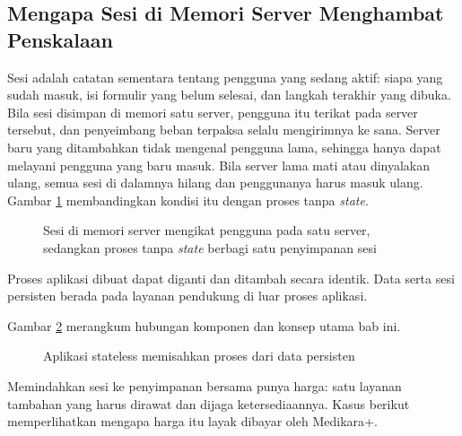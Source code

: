 \subsection{Mengapa Sesi di Memori Server Menghambat Penskalaan}

Sesi adalah catatan sementara tentang pengguna yang sedang aktif: siapa yang sudah masuk,
isi formulir yang belum selesai, dan langkah terakhir yang dibuka. Bila sesi disimpan di
memori satu server, pengguna itu terikat pada server tersebut, dan penyeimbang beban
terpaksa selalu mengirimnya ke sana. Server baru yang ditambahkan tidak mengenal pengguna
lama, sehingga hanya dapat melayani pengguna yang baru masuk. Bila server lama mati atau
dinyalakan ulang, semua sesi di dalamnya hilang dan penggunanya harus masuk ulang. Gambar
\ref{fig:ch05-sesi-skala} membandingkan kondisi itu dengan proses tanpa \textit{state}.

\begin{figure}[!htb]
  \centering
  
  \caption{Sesi di memori server mengikat pengguna pada satu server, sedangkan proses
           tanpa \textit{state} berbagi satu penyimpanan sesi}
  \label{fig:ch05-sesi-skala}
\end{figure}

Proses aplikasi dibuat dapat diganti dan ditambah secara identik.
Data serta sesi persisten berada pada layanan pendukung di luar proses aplikasi.

Gambar \ref{fig:ch05-loket-kembar} merangkum hubungan komponen dan konsep utama bab ini.
\begin{figure}[!htb]
  \centering
  
  \caption{Aplikasi stateless memisahkan proses dari data persisten}
  \label{fig:ch05-loket-kembar}
\end{figure}

Memindahkan sesi ke penyimpanan bersama punya harga: satu layanan tambahan yang harus
dirawat dan dijaga ketersediaannya. Kasus berikut memperlihatkan mengapa harga itu layak
dibayar oleh Medikara+.

